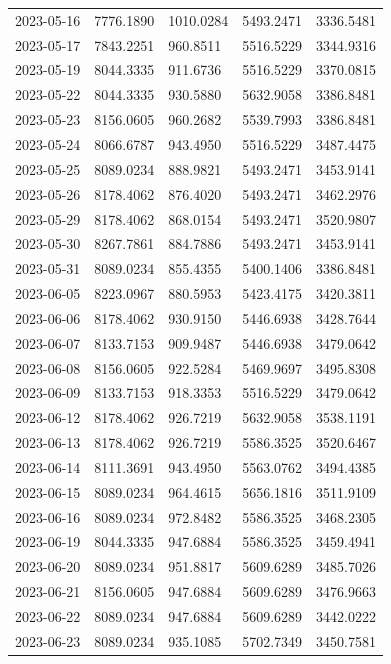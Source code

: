 \begin{footnotesize}
\begin{longtable}{lllll}
2023-05-16 & 7776.1890 & 1010.0284 & 5493.2471 & 3336.5481 \\
2023-05-17 & 7843.2251 & 960.8511 & 5516.5229 & 3344.9316 \\
2023-05-19 & 8044.3335 & 911.6736 & 5516.5229 & 3370.0815 \\
2023-05-22 & 8044.3335 & 930.5880 & 5632.9058 & 3386.8481 \\
2023-05-23 & 8156.0605 & 960.2682 & 5539.7993 & 3386.8481 \\
2023-05-24 & 8066.6787 & 943.4950 & 5516.5229 & 3487.4475 \\
2023-05-25 & 8089.0234 & 888.9821 & 5493.2471 & 3453.9141 \\
2023-05-26 & 8178.4062 & 876.4020 & 5493.2471 & 3462.2976 \\
2023-05-29 & 8178.4062 & 868.0154 & 5493.2471 & 3520.9807 \\
2023-05-30 & 8267.7861 & 884.7886 & 5493.2471 & 3453.9141 \\
2023-05-31 & 8089.0234 & 855.4355 & 5400.1406 & 3386.8481 \\
2023-06-05 & 8223.0967 & 880.5953 & 5423.4175 & 3420.3811 \\
2023-06-06 & 8178.4062 & 930.9150 & 5446.6938 & 3428.7644 \\
2023-06-07 & 8133.7153 & 909.9487 & 5446.6938 & 3479.0642 \\
2023-06-08 & 8156.0605 & 922.5284 & 5469.9697 & 3495.8308 \\
2023-06-09 & 8133.7153 & 918.3353 & 5516.5229 & 3479.0642 \\
2023-06-12 & 8178.4062 & 926.7219 & 5632.9058 & 3538.1191 \\
2023-06-13 & 8178.4062 & 926.7219 & 5586.3525 & 3520.6467 \\
2023-06-14 & 8111.3691 & 943.4950 & 5563.0762 & 3494.4385 \\
2023-06-15 & 8089.0234 & 964.4615 & 5656.1816 & 3511.9109 \\
2023-06-16 & 8089.0234 & 972.8482 & 5586.3525 & 3468.2305 \\
2023-06-19 & 8044.3335 & 947.6884 & 5586.3525 & 3459.4941 \\
2023-06-20 & 8089.0234 & 951.8817 & 5609.6289 & 3485.7026 \\
2023-06-21 & 8156.0605 & 947.6884 & 5609.6289 & 3476.9663 \\
2023-06-22 & 8089.0234 & 947.6884 & 5609.6289 & 3442.0222 \\
2023-06-23 & 8089.0234 & 935.1085 & 5702.7349 & 3450.7581 \\

\end{longtable}
\end{footnotesize}
